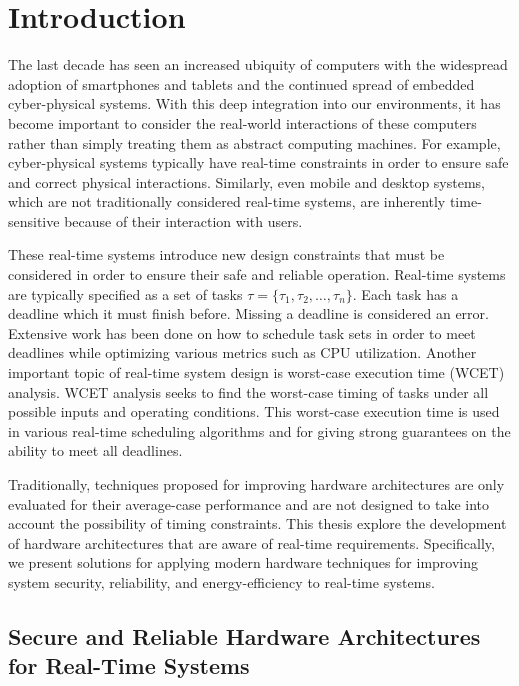 \chapter{Introduction}
\label{chap:intro}

The last decade has seen an increased ubiquity of computers with the widespread
adoption of smartphones and tablets and the continued spread of embedded
cyber-physical systems. With this deep integration into our environments, it has
become important to consider the real-world interactions of these computers
rather than simply treating them as abstract computing machines. For example,
cyber-physical systems typically have real-time constraints in order to ensure
safe and correct physical interactions. Similarly, even mobile and desktop
systems, which are not traditionally considered real-time systems, are
inherently time-sensitive because of their interaction with users.

These real-time systems introduce new design constraints that must be
considered in order to ensure their safe and reliable operation.
Real-time systems are typically specified as a set of tasks $\tau = \{\tau_1,
\tau_2, \dots, \tau_n\}$. Each task has a deadline which it must finish before.
Missing a deadline is considered an error. Extensive work has been done on how
to schedule task sets in order to meet deadlines while optimizing various
metrics such as CPU utilization. Another important topic of real-time system
design is worst-case execution time (WCET) analysis. WCET analysis seeks to
find the worst-case timing of tasks under all possible inputs and operating
conditions. This worst-case execution time is used in various real-time
scheduling algorithms and for giving strong guarantees on the ability to meet
all deadlines.

Traditionally, techniques proposed for improving
hardware architectures are only evaluated for their average-case
performance and are not designed to take into account the possibility of timing
constraints. This thesis explore the development of hardware
architectures that are aware of real-time requirements. Specifically, 
we present solutions for applying modern hardware techniques for improving
system security, reliability, and energy-efficiency to real-time systems.

\section{Secure and Reliable Hardware Architectures for Real-Time Systems}
\label{sec:intro.security}

